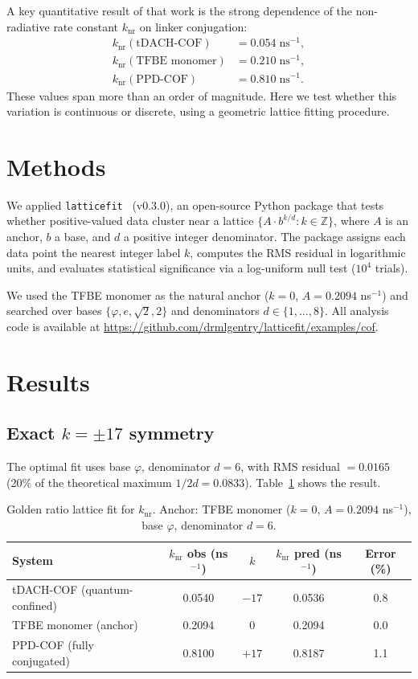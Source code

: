﻿\documentclass[11pt,a4paper]{article}
\begin{document}
A key quantitative result of that work is the strong dependence of the
non-radiative rate constant $k_{\mathrm{nr}}$ on linker conjugation:
\begin{align*}
k_{\mathrm{nr}}(\text{tDACH-COF}) &= 0.054\;\text{ns}^{-1},\\
k_{\mathrm{nr}}(\text{TFBE monomer}) &= 0.210\;\text{ns}^{-1},\\
k_{\mathrm{nr}}(\text{PPD-COF}) &= 0.810\;\text{ns}^{-1}.
\end{align*}
These values span more than an order of magnitude. Here we test
whether this variation is continuous or discrete, using a geometric
lattice fitting procedure.

\section{Methods}

We applied \texttt{latticefit}~\cite{Gentry:LatticeFit} (v0.3.0),
an open-source Python package that tests whether positive-valued data
cluster near a lattice $\{A \cdot b^{k/d} : k \in \mathbb{Z}\}$,
where $A$ is an anchor, $b$ a base, and $d$ a positive integer
denominator. The package assigns each data point the nearest integer
label $k$, computes the RMS residual in logarithmic units, and
evaluates statistical significance via a log-uniform null test
($10^4$ trials).

We used the TFBE monomer as the natural anchor ($k = 0$, $A = 0.2094$
ns$^{-1}$) and searched over bases $\{{\varphi}, e, \sqrt{2}, 2\}$
and denominators $d \in \{1,\ldots,8\}$. All analysis code is
available at \url{https://github.com/drmlgentry/latticefit/examples/cof}.

\section{Results}

\subsection{Exact $k = \pm 17$ symmetry}

The optimal fit uses base $\varphi$, denominator $d = 6$,
with RMS residual $= 0.0165$ (20\% of the theoretical maximum
$1/2d = 0.0833$). Table~\ref{tab:fit} shows the result.

\begin{table}[h]
\centering
\caption{Golden ratio lattice fit for $k_{\mathrm{nr}}$.
  Anchor: TFBE monomer ($k=0$, $A = 0.2094$ ns$^{-1}$),
  base $\varphi$, denominator $d=6$.}
\label{tab:fit}
\begin{tabular}{lcccc}
\toprule
System & {$k_{\mathrm{nr}}$ obs (ns$^{-1}$)} & $k$ &
  {$k_{\mathrm{nr}}$ pred (ns$^{-1}$)} & {Error (\%)} \\
\midrule
tDACH-COF (quantum-confined) & 0.0540 & $-17$ & 0.0536 & 0.8 \\
TFBE monomer (anchor)        & 0.2094 & $0$   & 0.2094 & 0.0 \\
PPD-COF (fully conjugated)   & 0.8100 & $+17$ & 0.8187 & 1.1 \\
\bottomrule
\end{tabular}
\end{table}
\end{document}
